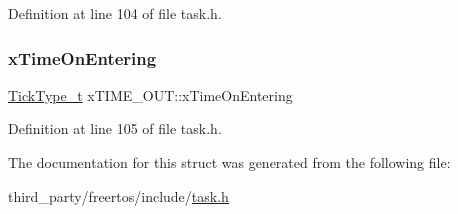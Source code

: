 Definition at line 104 of file task.\+h.

\mbox{\label{structxTIME__OUT_a3464939ca050f7bcc6ffe0d8d3766337}} 
\subsubsection{\texorpdfstring{x\+Time\+On\+Entering}{xTimeOnEntering}}
{\footnotesize\ttfamily \hyperlink{pic32mx_2portmacro_8h_aa69c48c6e902ce54f70886e6573c92a9}{Tick\+Type\+\_\+t} x\+T\+I\+M\+E\+\_\+\+O\+U\+T\+::x\+Time\+On\+Entering}



Definition at line 105 of file task.\+h.



The documentation for this struct was generated from the following file\+:\begin{DoxyCompactItemize}
\item 
third\+\_\+party/freertos/include/\hyperlink{task_8h}{task.\+h}\end{DoxyCompactItemize}
